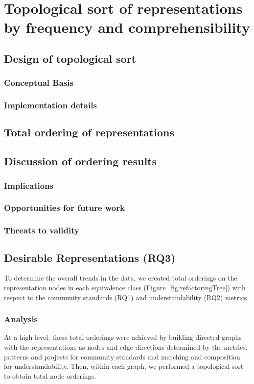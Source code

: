 \chapter{Topological sort of representations by frequency and comprehensibility}
\section{Design of topological sort}

\subsection{Conceptual Basis}
\subsection{Implementation details}

\section{Total ordering of representations}

\section{Discussion of ordering results}
\subsection{Implications}
\subsection{Opportunities for future work}
\subsection{Threats to validity}

\section{Desirable Representations (RQ3)}
\label{sec:rq3}
To determine the overall trends in the data, we created total orderings on the representation nodes in each equivalence class (Figure~\ref{fig:refactoringTree})  with respect to the community standards (RQ1)  and understandability (RQ2) metrics.

\subsection{Analysis}
At a high level, these total orderings were achieved by building directed graphs with the representations as nodes and edge directions determined by the metrics: patterns and projects for community standards and matching and composition for understandability. Then, within each graph, we performed a topological sort to obtain total node orderings.

